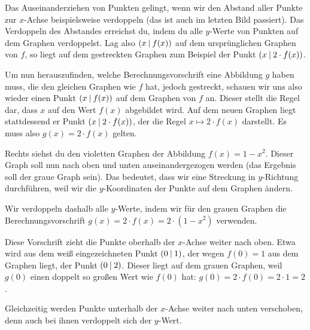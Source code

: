 \documentclass[../../main.tex]{subfiles}
\begin{document}
Das Auseinanderziehen von Punkten gelingt, wenn wir den Abstand aller Punkte zur $x$-Achse beispielsweise verdoppeln (das ist auch im letzten Bild passiert). Das Verdoppeln des Abstandes erreichst du, indem du alle $y$-Werte von Punkten auf dem Graphen verdoppelst. Lag also $\left(x \:\middle|\: f(x)\right)$ auf dem ursprünglichen Graphen von $f$, so liegt auf dem gestreckten Graphen zum Beispiel der Punkt $\left(x \:\middle|\: 2\cdot f(x)\right)$.

Um nun herauszufinden, welche Berechnungsvorschrift eine Abbildung $g$ haben muss, die den gleichen Graphen wie $f$ hat, jedoch gestreckt, schauen wir uns also wieder einen Punkt $\left(x \:\middle|\: f(x)\right)$ auf dem Graphen von $f$ an. Dieser stellt die Regel dar, dass $x$ auf den Wert $f(x)$ abgebildet wird. Auf dem neuen Graphen liegt stattdessend er Punkt $\left(x \:\middle|\: 2\cdot f(x)\right)$, der die Regel $x\mapsto 2\cdot f(x)$ darstellt. Es muss also $g(x)=2\cdot f(x)$ gelten.

\begin{example}
    Rechts siehst du den violetten Graphen der Abbildung $f(x)=1-x^2$. Dieser Graph soll nun nach oben und unten auseinandergezogen werden (das Ergebnis soll der graue Graph sein). Das bedeutet, dass wir eine Streckung in $y$-Richtung durchführen, weil wir die $y$-Koordinaten der Punkte auf dem Graphen ändern.
    
    Wir verdoppeln dashalb alle $y$-Werte, indem wir für den grauen Graphen die Berechnungsvorschrift $g(x)=2\cdot f(x)=2\cdot(1-x^2)$ verwenden.
    
    Diese Vorschrift zieht die Punkte oberhalb der $x$-Achse weiter nach oben. Etwa wird aus dem weiß eingezeichneten Punkt $\left(0 \:\middle|\: 1\right)$, der wegen $f(0)=1$ aus dem Graphen liegt, der Punkt $\left(0 \:\middle|\: 2\right)$. Dieser liegt auf dem grauen Graphen, weil $g(0)$ einen doppelt so großen Wert wie $f(0)$ hat: $g(0)=2\cdot f(0)=2\cdot 1=2$.
    
    Gleichzeitig werden Punkte unterhalb der $x$-Achse weiter nach unten verschoben, denn auch bei ihnen verdoppelt sich der $y$-Wert.
\end{example}
\end{document}
